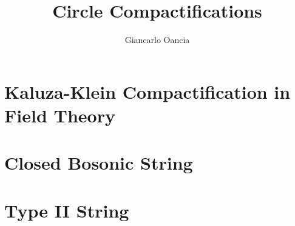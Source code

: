 \documentclass[a4paper,11pt]{report}
\title{Circle Compactifications}
\author[a]{Giancarlo Oancia}
\affiliation[a]{University of Bologna}
\begin{document}
\maketitle
\flushbottom
{}

\chapter{Kaluza-Klein Compactification in Field Theory}


\chapter{Closed Bosonic String}


\chapter{Type II String}


%


\end{document}
